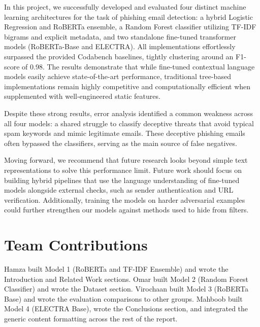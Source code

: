 \documentclass[11pt]{article}
\begin{document}
In this project, we successfully developed and evaluated four distinct machine learning architectures for the task of phishing email detection: a hybrid Logistic Regression and RoBERTa ensemble, a Random Forest classifier utilizing TF-IDF bigrams and explicit metadata, and two standalone fine-tuned transformer models (RoBERTa-Base and ELECTRA). All implementations effortlessly surpassed the provided Codabench baselines, tightly clustering around an F1-score of 0.98. The results demonstrate that while fine-tuned contextual language models easily achieve state-of-the-art performance, traditional tree-based implementations remain highly competitive and computationally efficient when supplemented with well-engineered static features.

Despite these strong results, error analysis identified a common weakness across all four models: a shared struggle to classify deceptive threats that avoid typical spam keywords and mimic legitimate emails. These deceptive phishing emails often bypassed the classifiers, serving as the main source of false negatives. 

Moving forward, we recommend that future research looks beyond simple text representations to solve this performance limit. Future work should focus on building hybrid pipelines that use the language understanding of fine-tuned models alongside external checks, such as sender authentication and URL verification. Additionally, training the models on harder adversarial examples could further strengthen our models against methods used to hide from filters.

\section*{Team Contributions}

Hamza built Model 1 (RoBERTa and TF-IDF Ensemble) and wrote the Introduction and Related Work sections. Omar built Model 2 (Random Forest Classifier) and wrote the Dataset section. Virochaan built Model 3 (RoBERTa Base) and wrote the evaluation comparisons to other groups. Mahboob built Model 4 (ELECTRA Base), wrote the Conclusions section, and integrated the generic content formatting across the rest of the report.

%





\end{document}
